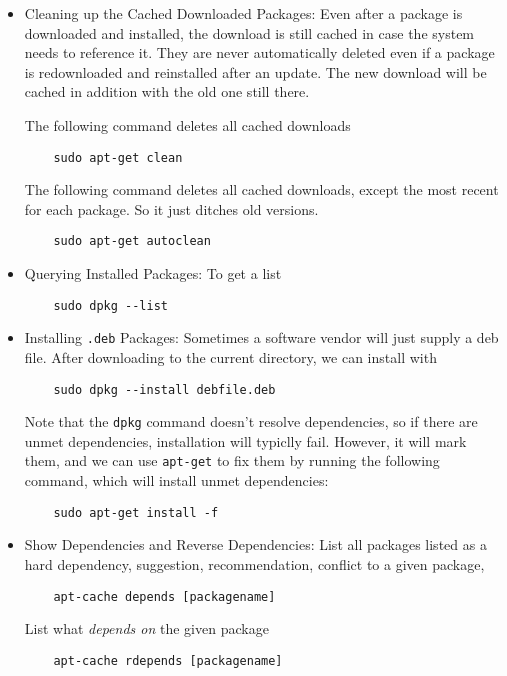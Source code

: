 \documentclass[12pt]{article}
\theoremstyle{plain}
\theoremstyle{definition}
\theoremstyle{remark}
\begin{document}
\begin{itemize}
  \item Cleaning up the Cached Downloaded Packages:
    Even after a package is downloaded and installed, the download is
    still cached in case the system needs to reference it.
    They are never automatically deleted even if a package is
    redownloaded and reinstalled after an update. The new download will
    be cached in addition with the old one still there.

    The following command deletes all cached downloads
    \begin{lstlisting}
    sudo apt-get clean
    \end{lstlisting}
    The following command deletes all cached downloads, except the most
    recent for each package. So it just ditches old versions.
    \begin{lstlisting}
    sudo apt-get autoclean
    \end{lstlisting}

  \item Querying Installed Packages:
    To get a list
    \begin{lstlisting}
    sudo dpkg --list
    \end{lstlisting}

  \item Installing \texttt{.deb} Packages:
    Sometimes a software vendor will just supply a deb file.
    After downloading to the current directory, we can install with
    \begin{lstlisting}
    sudo dpkg --install debfile.deb
    \end{lstlisting}
    Note that the \texttt{dpkg} command doesn't resolve dependencies, so
    if there are unmet dependencies, installation will typiclly fail.
    However, it will mark them, and we can use \texttt{apt-get} to fix
    them by running the following command, which will install unmet
    dependencies:
    \begin{lstlisting}
    sudo apt-get install -f
    \end{lstlisting}

  \item Show Dependencies and Reverse Dependencies:
    List all packages listed as a hard dependency, suggestion,
    recommendation, conflict to a given package,
    \begin{lstlisting}
    apt-cache depends [packagename]
    \end{lstlisting}
    List what \emph{depends on} the given package
    \begin{lstlisting}
    apt-cache rdepends [packagename]
    \end{lstlisting}


\end{itemize}
\end{document}
